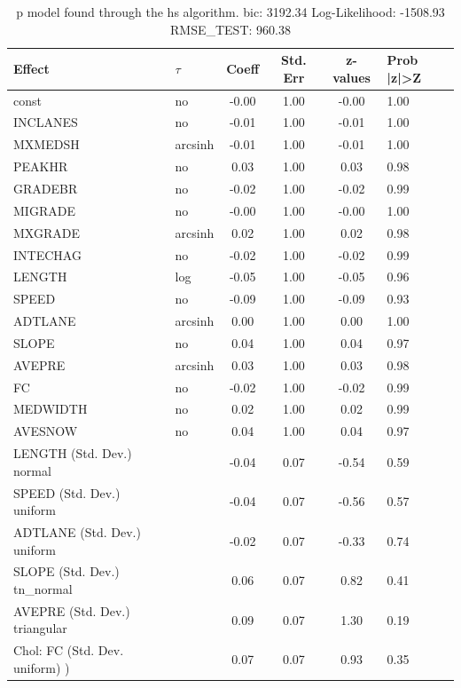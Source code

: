 \begin{table}
	\caption{p model found through the hs algorithm. bic: 3192.34 Log-Likelihood: -1508.93 RMSE_TEST: 960.38}
	\begin{center}
		\begin{tabular}{|l|l|c|c|c|l|}
			\hline
			Effect & $\tau$ & Coeff & Std. Err & z-values & Prob |z|>Z \\
			\hline
			const & no & -0.00 & 1.00 & -0.00 & 1.00 \\
			\hline
			INCLANES & no & -0.01 & 1.00 & -0.01 & 1.00 \\
			\hline
			MXMEDSH & arcsinh & -0.01 & 1.00 & -0.01 & 1.00 \\
			\hline
			PEAKHR & no & 0.03 & 1.00 & 0.03 & 0.98 \\
			\hline
			GRADEBR & no & -0.02 & 1.00 & -0.02 & 0.99 \\
			\hline
			MIGRADE & no & -0.00 & 1.00 & -0.00 & 1.00 \\
			\hline
			MXGRADE & arcsinh & 0.02 & 1.00 & 0.02 & 0.98 \\
			\hline
			INTECHAG & no & -0.02 & 1.00 & -0.02 & 0.99 \\
			\hline
			LENGTH & log & -0.05 & 1.00 & -0.05 & 0.96 \\
			\hline
			SPEED & no & -0.09 & 1.00 & -0.09 & 0.93 \\
			\hline
			ADTLANE & arcsinh & 0.00 & 1.00 & 0.00 & 1.00 \\
			\hline
			SLOPE & no & 0.04 & 1.00 & 0.04 & 0.97 \\
			\hline
			AVEPRE & arcsinh & 0.03 & 1.00 & 0.03 & 0.98 \\
			\hline
			FC & no & -0.02 & 1.00 & -0.02 & 0.99 \\
			\hline
			MEDWIDTH & no & 0.02 & 1.00 & 0.02 & 0.99 \\
			\hline
			AVESNOW & no & 0.04 & 1.00 & 0.04 & 0.97 \\
			\hline
			LENGTH (Std. Dev.) normal &  & -0.04 & 0.07 & -0.54 & 0.59 \\
			\hline
			SPEED (Std. Dev.) uniform &  & -0.04 & 0.07 & -0.56 & 0.57 \\
			\hline
			ADTLANE (Std. Dev.) uniform &  & -0.02 & 0.07 & -0.33 & 0.74 \\
			\hline
			SLOPE (Std. Dev.) tn_normal &  & 0.06 & 0.07 & 0.82 & 0.41 \\
			\hline
			AVEPRE (Std. Dev.) triangular &  & 0.09 & 0.07 & 1.30 & 0.19 \\
			\hline
			 Chol: FC (Std. Dev. uniform) ) &  & 0.07 & 0.07 & 0.93 & 0.35 \\

\end{tabular}
\end{center}
\end{table}
